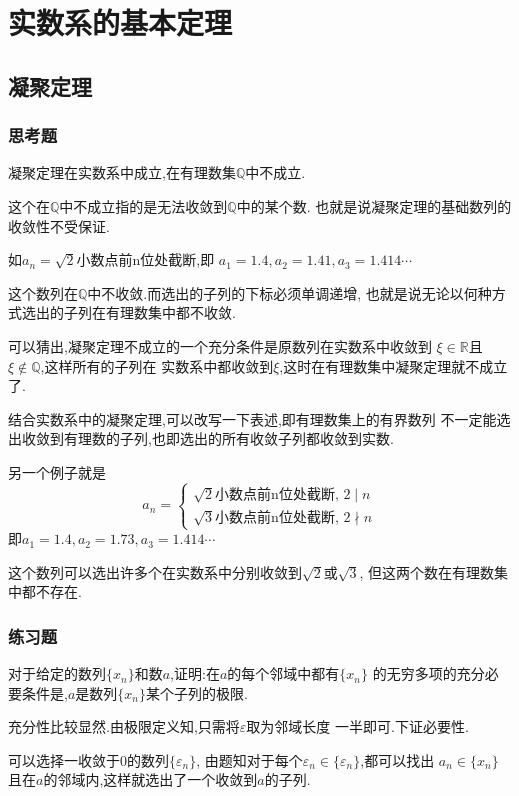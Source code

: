 \documentclass[cn]{elegantbook}
\begin{document}
    \chapter{实数系的基本定理}
    \section{凝聚定理}
    \subsection{思考题}
        \begin{example}
            凝聚定理在实数系中成立,在有理数集$\mathbb{Q} $中不成立.
        \end{example}
        \begin{solution}
            这个在$\mathbb{Q}$中不成立指的是无法收敛到$\mathbb{Q}$中的某个数.
            也就是说凝聚定理的基础数列的收敛性不受保证.
            
            如$a_n=\sqrt{2}$小数点前n位处截断,即
            $a_1=1.4,a_2=1.41,a_3=1.414\cdots$

            这个数列在$\mathbb{Q}$中不收敛.而选出的子列的下标必须单调递增,
            也就是说无论以何种方式选出的子列在有理数集中都不收敛.

            可以猜出,凝聚定理不成立的一个充分条件是原数列在实数系中收敛到
            $\xi\in\mathbb{R}$且$\xi\notin\mathbb{Q}$,这样所有的子列在
            实数系中都收敛到$\xi$,这时在有理数集中凝聚定理就不成立了.

            结合实数系中的凝聚定理,可以改写一下表述,即有理数集上的有界数列
            不一定能选出收敛到有理数的子列,也即选出的所有收敛子列都收敛到实数.

            另一个例子就是
            \[a_n=\begin{cases}
                \sqrt{2}\text{小数点前n位处截断},\, 2\mid  n\\
                \sqrt{3}\text{小数点前n位处截断},\, 2\nmid n
            \end{cases}\]
            即$a_1=1.4,a_2=1.73,a_3=1.414\cdots$

            这个数列可以选出许多个在实数系中分别收敛到$\sqrt{2}$或$\sqrt{3}$,
            但这两个数在有理数集中都不存在.
        \end{solution}
    \subsection{练习题}
        \begin{exercise}
            对于给定的数列$\{x_n\}$和数$a$,证明:在$a$的每个邻域中都有$\{x_n\}$
        的无穷多项的充分必要条件是,$a$是数列$\{x_n\}$某个子列的极限.
        \end{exercise}
        \begin{solution}
            充分性比较显然.由极限定义知,只需将$\varepsilon$取为邻域长度
            一半即可.下证必要性.
            
            可以选择一收敛于0的数列$\{\varepsilon_n\}$,
            由题知对于每个$\varepsilon_n\in\{\varepsilon_n\}$,都可以找出
            $a_n\in\{x_n\}$且在$a$的邻域内,这样就选出了一个收敛到$a$的子列.
        \end{solution}
\end{document}
